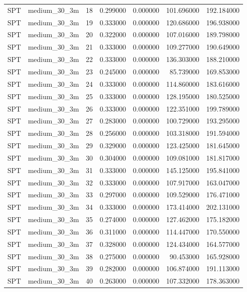 \begin{tabular}{llrrrrr}
SPT & medium_30_3m & 18 & 0.299000 & 0.000000 & 101.696000 & 192.184000 \\
SPT & medium_30_3m & 19 & 0.333000 & 0.000000 & 120.686000 & 196.938000 \\
SPT & medium_30_3m & 20 & 0.322000 & 0.000000 & 107.016000 & 189.798000 \\
SPT & medium_30_3m & 21 & 0.333000 & 0.000000 & 109.277000 & 190.649000 \\
SPT & medium_30_3m & 22 & 0.333000 & 0.000000 & 136.303000 & 188.210000 \\
SPT & medium_30_3m & 23 & 0.245000 & 0.000000 & 85.739000 & 169.853000 \\
SPT & medium_30_3m & 24 & 0.333000 & 0.000000 & 114.860000 & 183.616000 \\
SPT & medium_30_3m & 25 & 0.333000 & 0.000000 & 128.195000 & 180.525000 \\
SPT & medium_30_3m & 26 & 0.333000 & 0.000000 & 122.351000 & 199.789000 \\
SPT & medium_30_3m & 27 & 0.283000 & 0.000000 & 100.729000 & 193.295000 \\
SPT & medium_30_3m & 28 & 0.256000 & 0.000000 & 103.318000 & 191.594000 \\
SPT & medium_30_3m & 29 & 0.329000 & 0.000000 & 123.425000 & 181.645000 \\
SPT & medium_30_3m & 30 & 0.304000 & 0.000000 & 109.081000 & 181.817000 \\
SPT & medium_30_3m & 31 & 0.333000 & 0.000000 & 145.125000 & 195.841000 \\
SPT & medium_30_3m & 32 & 0.333000 & 0.000000 & 107.917000 & 163.047000 \\
SPT & medium_30_3m & 33 & 0.297000 & 0.000000 & 109.529000 & 176.471000 \\
SPT & medium_30_3m & 34 & 0.333000 & 0.000000 & 173.414000 & 202.131000 \\
SPT & medium_30_3m & 35 & 0.274000 & 0.000000 & 127.462000 & 175.182000 \\
SPT & medium_30_3m & 36 & 0.311000 & 0.000000 & 114.447000 & 170.550000 \\
SPT & medium_30_3m & 37 & 0.328000 & 0.000000 & 124.434000 & 164.577000 \\
SPT & medium_30_3m & 38 & 0.275000 & 0.000000 & 90.453000 & 165.928000 \\
SPT & medium_30_3m & 39 & 0.282000 & 0.000000 & 106.874000 & 191.113000 \\
SPT & medium_30_3m & 40 & 0.263000 & 0.000000 & 107.332000 & 178.363000 \\

\end{tabular}
